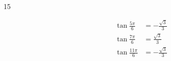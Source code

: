 \documentclass{exam}
\begin{document}
\begin{description}




      \item[15]
        \begin{align*}
          \tan \frac{5 \pi}{6}  & = - \frac{\sqrt{3}}{3} \\
          \tan \frac{7 \pi}{6}  & = \frac{\sqrt{3}}{3} \\
          \tan \frac{11 \pi}{6} & = - \frac{\sqrt{3}}{3} \\
        \end{align*}


\end{description}
\end{document}

